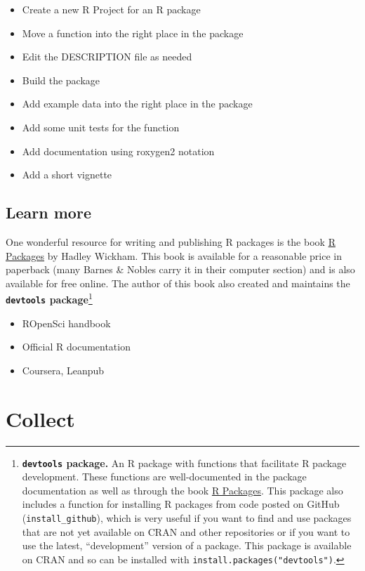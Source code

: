 \documentclass[]{tufte-book}
\providecommand{\tightlist}{%
  \setlength{\itemsep}{0pt}\setlength{\parskip}{0pt}}
\begin{document}
\begin{itemize}
\tightlist
\item
  Create a new R Project for an R package
\item
  Move a function into the right place in the package
\item
  Edit the DESCRIPTION file as needed
\item
  Build the package
\item
  Add example data into the right place in the package
\item
  Add some unit tests for the function
\item
  Add documentation using roxygen2 notation
\item
  Add a short vignette
\end{itemize}

\hypertarget{learn-more-2}{%
\section{Learn more}\label{learn-more-2}}

One wonderful resource for writing and publishing R packages is the book \href{http://r-pkgs.had.co.nz/}{R
Packages} by Hadley Wickham. This book is available
for a reasonable price in paperback (many Barnes \& Nobles carry it in their
computer section) and is also available for free online. The author of this book
also created and maintains the \textbf{\texttt{devtools} package}\footnote{\textbf{\texttt{devtools} package.}
  An R package with functions that facilitate R package development. These
  functions are well-documented in the package documentation as well as through
  the book \href{http://r-pkgs.had.co.nz/}{R Packages}. This package also includes a
  function for installing R packages from code posted on GitHub
  (\texttt{install\_github}), which is very useful if you want to find and use packages
  that are not yet available on CRAN and other repositories or if you want to use
  the latest, ``development'' version of a package. This package is available on
  CRAN and so can be installed with \texttt{install.packages("devtools")}.}

\begin{itemize}
\tightlist
\item
  ROpenSci handbook
\item
  Official R documentation
\item
  Coursera, Leanpub
\end{itemize}

\hypertarget{collect}{%
\chapter{Collect}\label{collect}}
\end{document}
